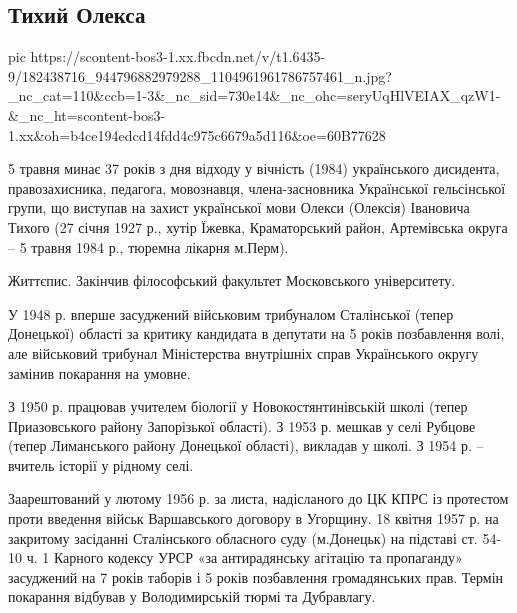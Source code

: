  
 
 
 
 
\subsection{Тихий Олекса}
\label{sec:04_05_2021.fb.kolomiec_jurij.1.tihij_oleksa}

\ifcmt
  pic https://scontent-bos3-1.xx.fbcdn.net/v/t1.6435-9/182438716_944796882979288_1104961961786757461_n.jpg?_nc_cat=110&ccb=1-3&_nc_sid=730e14&_nc_ohc=seryUqHlVEIAX_qzW1-&_nc_ht=scontent-bos3-1.xx&oh=b4ce194edcd14fdd4c975c6679a5d116&oe=60B77628
\fi

5 травня минає 37 років з дня відходу у вічність (1984) українського дисидента,
правозахисника, педагога, мовознавця, члена-засновника Української гельсінської
групи, що виступав на захист української мови Олекси (Олексія) Івановича Тихого
(27 січня 1927 р., хутір Їжевка, Краматорський район, Артемівська округа – 5
травня 1984 р., тюремна лікарня м.Перм).

Життєпис. Закінчив філософський факультет Московського університету.

У 1948 р. вперше засуджений військовим трибуналом Сталінської (тепер Донецької)
області за критику кандидата в депутати на 5 років позбавлення волі, але
військовий трибунал Міністерства внутрішніх справ Українського округу замінив
покарання на умовне.

З 1950 р. працював учителем біології у Новокостянтинівській школі (тепер
Приазовського району Запорізької області). З 1953 р. мешкав у селі Рубцове
(тепер Лиманського району Донецької області), викладав у школі. З 1954 р. –
вчитель історії у рідному селі.

Заарештований у лютому 1956 р. за листа, надісланого до ЦК КПРС із протестом
проти введення військ Варшавського договору в Угорщину. 18 квітня 1957 р. на
закритому засіданні Сталінського обласного суду (м.Донецьк) на підставі ст.
54-10 ч. 1 Карного кодексу УРСР «за антирадянську агітацію та пропаганду»
засуджений на 7 років таборів і 5 років позбавлення громадянських прав. Термін
покарання відбував у Володимирській тюрмі та Дубравлагу.

